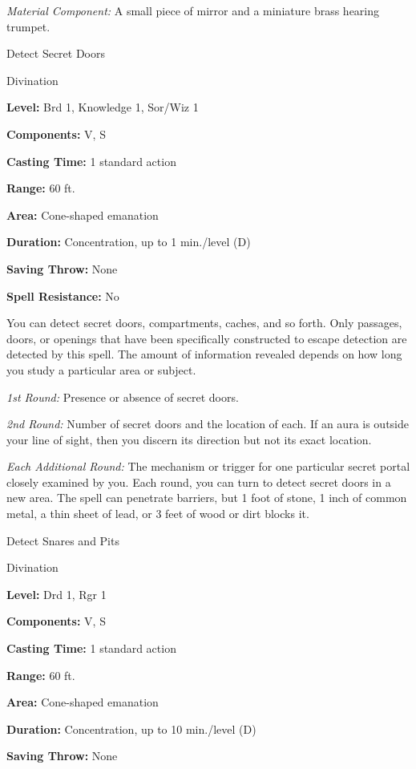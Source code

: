 \documentclass{article}
\begin{document}
\textit{Material Component: }A small piece of mirror and a miniature brass hearing 
trumpet.

\vspace{12pt}
Detect Secret Doors

Divination

\textbf{Level:} Brd 1, Knowledge 1, Sor/Wiz 1

\textbf{Components:} V, S

\textbf{Casting Time:} 1 standard action

\textbf{Range:} 60 ft.

\textbf{Area:} Cone-shaped emanation

\textbf{Duration:} Concentration, up to 1 min./level (D)

\textbf{Saving Throw:} None

\textbf{Spell Resistance:} No

You can detect secret doors, compartments, caches, and so forth. Only passages, 
doors, or openings that have been specifically constructed to escape detection 
are detected by this spell. The amount of information revealed depends on how long 
you study a particular area or subject.

\textit{1st Round: }Presence or absence of secret doors.

\textit{2nd Round: }Number of secret doors and the location of each. If an aura 
is outside your line of sight, then you discern its direction but not its exact 
location.

\textit{Each Additional Round: }The mechanism or trigger for one particular secret 
portal closely examined by you. Each round, you can turn to detect secret doors 
in a new area. The spell can penetrate barriers, but 1 foot of stone, 1 inch of 
common metal, a thin sheet of lead, or 3 feet of wood or dirt blocks it.

\vspace{12pt}
Detect Snares and Pits

Divination

\textbf{Level:} Drd 1, Rgr 1

\textbf{Components:} V, S

\textbf{Casting Time:} 1 standard action

\textbf{Range:} 60 ft.

\textbf{Area:} Cone-shaped emanation

\textbf{Duration:} Concentration, up to 10 min./level (D)

\textbf{Saving Throw:} None
\end{document}
